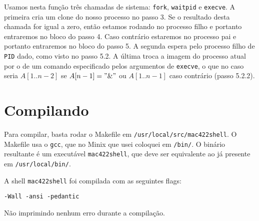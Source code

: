 \documentclass{amsart}
\theoremstyle{plain}
\newcommand{\code}[1]{\lstinline[mathescape=true]{#1}}
\begin{document}
Usamos nesta função três chamadas de sistema: \code{fork}, \code{waitpid} e \code{execve}. A
primeira cria um clone do nosso processo no passo 3. Se o resultado desta chamada for igual a zero,
então estamos rodando no processo filho e portanto entraremos no bloco do passo 4. Caso contrário
estaremos no processo pai e portanto entraremos no bloco do passo 5. A segunda espera pelo processo
filho de \code{PID} dado, como visto no passo 5.2. A última troca a imagem do processo atual por o
de um comando especificado pelos argumentos de \code{execve}, o que no caso seria $A[1..n-2]$ se
$A[n-1]="\&"$ ou $A[1..n-1]$ caso contrário (passo 5.2.2).

\section{Compilando}

Para compilar, basta rodar o Makefile em \code{/usr/local/src/mac422shell}. O Makefile usa o
\code{gcc}, que no Minix que usei coloquei em \code{/bin/}. O binário resultante é um executável
\code{mac422shell}, que deve ser equivalente ao já presente em \code{/usr/local/bin/}.

A shell \code{mac422shell} foi compilada com as seguintes flags:

\begin{lstlisting}[style=nonumbers]
  -Wall -ansi -pedantic
\end{lstlisting}

Não imprimindo nenhum erro durante a compilação.
\end{document}
